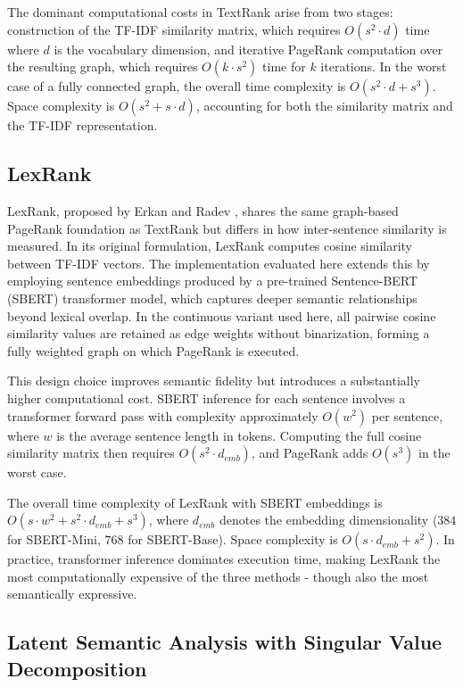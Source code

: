 \documentclass[12pt,twoside,en,win]{bmzhart}
\begin{document}
	The dominant computational costs in TextRank arise from two stages: construction of the TF-IDF similarity 
	matrix, which requires $O(s^2 \cdot d)$ time where $d$ is the vocabulary dimension, and iterative PageRank 
	computation over the resulting graph, which requires $O(k \cdot s^2)$ time for $k$ iterations. In the worst 
	case of a fully connected graph, the overall time complexity is $O(s^2 \cdot d + s^3)$. Space complexity is 
	$O(s^2 + s \cdot d)$, accounting for both the similarity matrix and the TF-IDF representation.

	\subsection{LexRank}

	LexRank, proposed by Erkan and Radev \cite{k9}, shares the same graph-based PageRank foundation as TextRank but 
	differs in how inter-sentence similarity is measured. In its original formulation, LexRank computes cosine 
	similarity between TF-IDF vectors. The implementation evaluated here extends this by employing sentence 
	embeddings produced by a pre-trained Sentence-BERT (SBERT) transformer model, which captures deeper semantic 
	relationships beyond lexical overlap. In the continuous variant used here, all pairwise cosine similarity 
	values are retained as edge weights without binarization, forming a fully weighted graph on which PageRank 
	is executed.

	This design choice improves semantic fidelity but introduces a substantially higher computational cost. 
	SBERT inference for each sentence involves a transformer forward pass with complexity approximately 
	$O(w^2)$ per sentence, where $w$ is the average sentence length in tokens. Computing the full cosine 
	similarity matrix then requires $O(s^2 \cdot d_{emb})$, and PageRank adds $O(s^3)$ in the worst case.

	The overall time complexity of LexRank with SBERT embeddings is $O(s \cdot w^2 + s^2 \cdot d_{emb} + s^3)$, 
	where $d_{emb}$ denotes the embedding dimensionality ($384$ for SBERT-Mini, $768$ for SBERT-Base). 
	Space complexity is $O(s \cdot d_{emb} + s^2)$. In practice, transformer inference dominates execution 
	time, making LexRank the most computationally expensive of the three methods - though also the most 
	semantically expressive.

	\subsection{Latent Semantic Analysis with Singular Value Decomposition}
\end{document}
